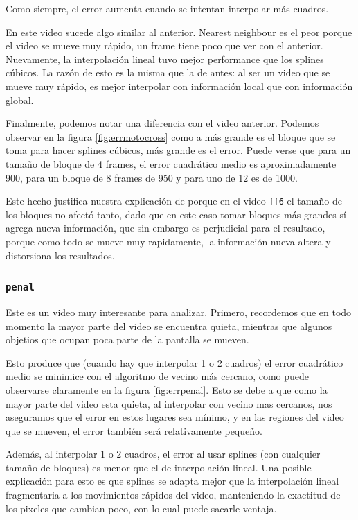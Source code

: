 Como siempre, el error aumenta cuando se intentan interpolar más cuadros.

En este video sucede algo similar al anterior. Nearest neighbour es el peor porque el video se mueve muy rápido, un frame tiene poco que ver con el anterior. Nuevamente, la interpolación lineal tuvo mejor performance que los splines cúbicos. La razón de esto es la misma que la de antes: al ser un video que se mueve muy rápido, es mejor interpolar con información local que con información global.

Finalmente, podemos notar una diferencia con el video anterior. Podemos observar en la figura \ref{fig:errmotocross} como a más grande es el bloque que se toma para hacer splines cúbicos, más grande es el error. Puede verse que para un tamaño de bloque de 4 frames, el error cuadrático medio es aproximadamente 900, para un bloque de 8 frames de 950 y para uno de 12 es de 1000. 


Este hecho justifica nuestra explicación de porque en el video \texttt{ff6} el tamaño de los bloques no afectó tanto, dado que en este caso tomar bloques más grandes sí agrega nueva información, que sin embargo es perjudicial para el resultado, porque como todo se mueve muy rapidamente, la información nueva altera y distorsiona los resultados.

\subsubsection{\texttt{penal}}

Este es un video muy interesante para analizar. Primero, recordemos que en todo momento la mayor parte del video se encuentra quieta, mientras que algunos objetios que ocupan poca parte de la pantalla se mueven. 

Esto produce que (cuando hay que interpolar 1 o 2 cuadros) el error cuadrático medio se minimice con el algoritmo de vecino más cercano, como puede observarse claramente en la figura \ref{fig:errpenal}. Esto se debe a que como la mayor parte del video esta quieta, al interpolar con vecino mas cercanos, nos aseguramos que el error en estos lugares sea mínimo, y en las regiones del video que se mueven, el error tambi\'en será relativamente pequeño.

Además, al interpolar 1 o 2 cuadros, el error al usar splines (con cualquier tamaño de bloques) es menor que el de interpolación lineal. Una posible explicación para esto es que splines se adapta mejor que la interpolación lineal fragmentaria a los movimientos rápidos del video, manteniendo la exactitud de los pixeles que cambian poco, con lo cual puede sacarle ventaja.

